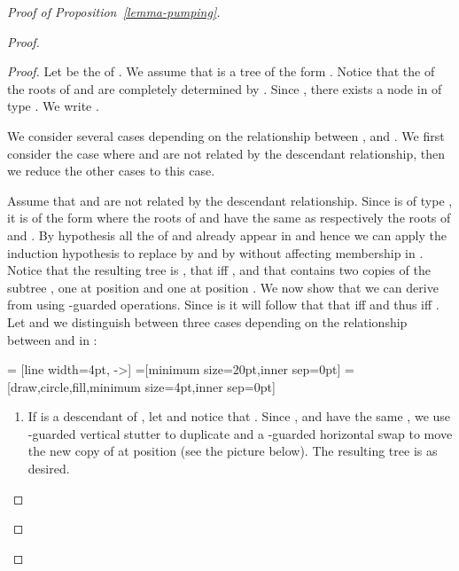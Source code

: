 \begin{proof}[Proof of Proposition~\ref{lemma-pumping}]
\begin{proof}
\begin{proof}
  Let  be the  of . We assume that  is a tree of the form
  . Notice that the \ktype of the roots of  and  are completely determined
  by . Since , there exists a node  in  of
  type . We write .

  We consider several cases depending on the relationship between ,  and .
  We first consider the case where  and  are not related by the descendant
  relationship, then we reduce the other cases to this case.

  Assume that  and  are not related by the descendant relationship. Since
   is of type , it is of the form  where the roots
  of  and  have the same \ktype as respectively the roots of
   and . By hypothesis all the  of  and 
  already appear in  and hence we can apply the induction hypothesis to
  replace  by  and  by  without affecting membership
  in . Notice that the resulting tree is , that  iff
  , and that  contains two copies of the subtree , one
  at position  and one at position . We now show that we can derive
   from  using -guarded operations. Since  is \ktame it will
  follow that that  iff  and thus  iff .
  Let  and we distinguish between three cases depending on the relationship between  and  in
  :


 = [line width=4pt, ->]
=[minimum size=20pt,inner sep=0pt]
=[draw,circle,fill,minimum size=4pt,inner sep=0pt]

\begin{enumerate}[(1)]
\item If  is a descendant of , let  and notice that . Since ,  and  have
  the same \ktype, we use -guarded vertical stutter to duplicate  and a
  -guarded horizontal swap to move the new copy of  at position  (see
  the picture below). The resulting tree is  as desired.


\begin{center}
\end{center}
\end{enumerate}
\end{proof}
\end{proof}
\end{proof}
